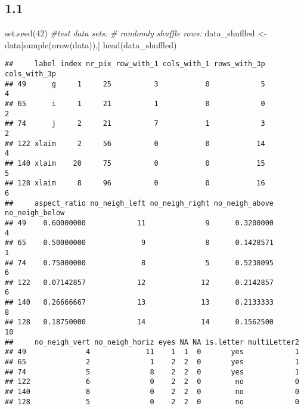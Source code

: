 \documentclass[
]{article}
\newenvironment{Shaded}{\begin{snugshade}}{\end{snugshade}}
\newcommand{\CommentTok}[1]{\textcolor[rgb]{0.56,0.35,0.01}{\textit{#1}}}
\newcommand{\DecValTok}[1]{\textcolor[rgb]{0.00,0.00,0.81}{#1}}
\newcommand{\FunctionTok}[1]{\textcolor[rgb]{0.00,0.00,0.00}{#1}}
\newcommand{\NormalTok}[1]{#1}
\newcommand{\OtherTok}[1]{\textcolor[rgb]{0.56,0.35,0.01}{#1}}
\begin{document}
\hypertarget{section}{%
\subsection{1.1}\label{section}}

\begin{Shaded}
\begin{Highlighting}[]
\FunctionTok{set.seed}\NormalTok{(}\DecValTok{42}\NormalTok{)}
\CommentTok{\#test data sets:}
\CommentTok{\# randomly shuffle rows:}
\NormalTok{data\_shuffled }\OtherTok{\textless{}{-}}\NormalTok{ data[}\FunctionTok{sample}\NormalTok{(}\FunctionTok{nrow}\NormalTok{(data)),]}
\FunctionTok{head}\NormalTok{(data\_shuffled)}
\end{Highlighting}
\end{Shaded}

\begin{verbatim}
##     label index nr_pix row_with_1 cols_with_1 rows_with_3p cols_with_3p
## 49      g     1     25          3           0            5            4
## 65      i     1     21          1           0            0            2
## 74      j     2     21          7           1            3            2
## 122 xlaim     2     56          0           0           14            4
## 140 xlaim    20     75          0           0           15            5
## 128 xlaim     8     96          0           0           16            6
##     aspect_ratio no_neigh_left no_neigh_right no_neigh_above no_neigh_below
## 49    0.60000000            11              9      0.3200000              4
## 65    0.50000000             9              8      0.1428571              1
## 74    0.75000000             8              5      0.5238095              6
## 122   0.07142857            12             12      0.2142857              6
## 140   0.26666667            13             13      0.2133333              8
## 128   0.18750000            14             14      0.1562500             10
##     no_neigh_vert no_neigh_horiz eyes NA NA is.letter multiLetter2
## 49              4             11    1  1  0       yes            1
## 65              2              1    2  2  0       yes            1
## 74              5              8    2  2  0       yes            1
## 122             6              0    2  2  0        no            0
## 140             8              0    2  2  0        no            0
## 128             5              0    2  2  0        no            0
\end{verbatim}
\end{document}
